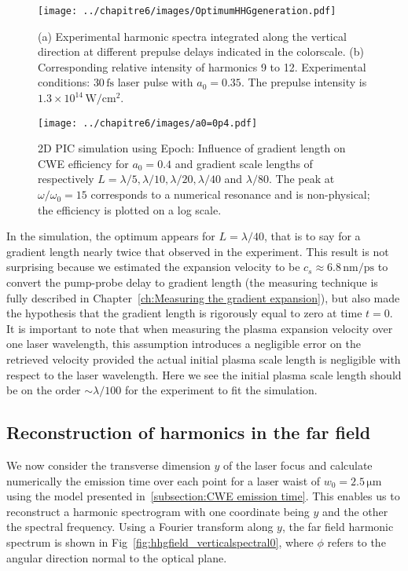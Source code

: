 \begin{figure}[H]
\centering
\texttt{[image: ../chapitre6/images/OptimumHHGgeneration.pdf]}\\
\caption{\label{fig:OptimumHHGgeneration}(a) Experimental  harmonic spectra integrated along the vertical direction at different prepulse delays indicated in the colorscale. (b) Corresponding relative intensity of harmonics 9 to 12.  Experimental conditions: $30\,\mathrm{fs}$ laser pulse with $a_0=0.35$. The prepulse intensity is $1.3 \times 10^{14}\,\mathrm{W/cm^2}$.}
\end{figure}


\begin{figure}[H]
\centering
\texttt{[image: ../chapitre6/images/a0=0p4.pdf]}\\
\caption{\label{fig:a0=0p4}2D PIC simulation using Epoch: Influence of gradient length on CWE efficiency for $a_0 = 0.4$ and gradient scale lengths of respectively $L = \lambda/5, \lambda/10,\lambda/20,\lambda/40$ and $\lambda/80$. The peak at $\omega/\omega_0 = 15$ corresponds to a numerical resonance and is non-physical; the efficiency is plotted on a log scale.}
\end{figure}

\noindent In the simulation, the optimum appears for $L = \lambda/40$, that is to say for a gradient length nearly twice that observed in the experiment. This result is not surprising because  we estimated the expansion velocity to be $c_s\approx 6.8\,\mathrm{nm/ps}$ to convert the pump-probe delay to gradient length (the measuring technique is fully described in Chapter~\ref{ch:Measuring the gradient expansion}), but also made the hypothesis that the gradient length is rigorously equal to zero at time $t=0$.  It is important to note that when measuring the plasma expansion velocity over one laser wavelength, this assumption introduces a negligible error on the retrieved velocity provided the actual initial plasma scale length is negligible with respect to the laser wavelength. Here we see the initial plasma scale length should be on the order $\sim \lambda / 100$ for the experiment to fit the simulation.


\subsection{Reconstruction of harmonics in the far field}

We now consider the transverse dimension $y$ of the laser focus and calculate numerically the emission time over each point for a laser waist of $w_0 = 2.5\,\mathrm{\mu m}$ using the model presented in~\ref{subsection:CWE emission time}. This enables us to reconstruct a harmonic spectrogram with one coordinate being $y$ and the other the spectral frequency. Using a Fourier transform along $y$, the far field  harmonic spectrum is shown in Fig~\ref{fig:hhgfield_verticalspectral0}, where $\phi$ refers to the angular direction normal to the optical plane. 


